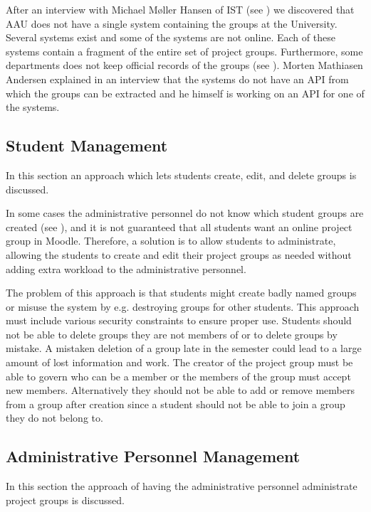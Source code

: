 After an interview with Michael Møller Hansen of IST (see ) we discovered that AAU does not have a single system containing the groups at the University.
Several systems exist and some of the systems are not online.
Each of these systems contain a fragment of the entire set of project groups.
Furthermore, some departments does not keep official records of the groups (see ).
Morten Mathiasen Andersen explained in an interview that the systems do not have an API from which the groups can be extracted and he himself is working on an API for one of the systems.





\subsection{Student Management}
In this section an approach which lets students create, edit, and delete groups is discussed. 

In some cases the administrative personnel do not know which student groups are created (see ), and it is not guaranteed that all students want an online project group in Moodle. 
Therefore, a solution is to allow students to administrate, allowing the students to create and edit their project groups as needed without adding extra workload to the administrative personnel.

The problem of this approach is that students might create badly named groups or misuse the system by e.g. destroying groups for other students. 
This approach must include various security constraints to ensure proper use. 
Students should not be able to delete groups they are not members of or to delete groups by mistake. 
A mistaken deletion of a group late in the semester could lead to a large amount of lost information and work. 
The creator of the project group must be able to govern who can be a member or the members of the group must accept new members.
Alternatively they should not be able to add or remove members from a group after creation since a student should not be able to join a group they do not belong to. 


\subsection{Administrative Personnel Management}
In this section the approach of having the administrative personnel administrate project groups is discussed. 

